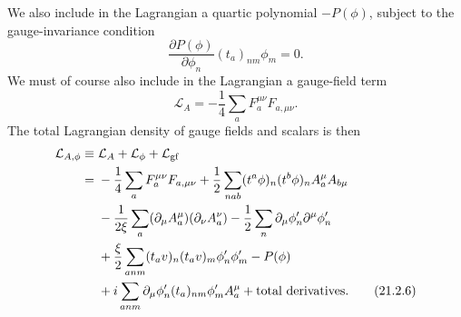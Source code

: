 We also include in the Lagrangian a quartic polynomial $-P(\phi)$, subject
to the gauge-invariance condition
\begin{equation}
 \frac{\partial P(\phi)}{\partial\phi_n}
 (t_a)_{nm}\phi_m=0.
 \tag{21.2.4}\label{eq:21.2.4}
\end{equation}
We must of course also include in the Lagrangian a gauge-field term
\begin{equation}
 \mathcal L_A=-\frac14\sum_a
 F_a^{\mu\nu}F_{a,\mu\nu}.
 \tag{21.2.5}\label{eq:21.2.5}
\end{equation}
The total Lagrangian density of gauge fields and scalars is then
\begin{align}
 \mathcal L_{A,\phi}
 \equiv{}&\mathcal L_A+\mathcal L_\phi+\mathcal L_{\rm gf}
 \notag\\
 ={}&-\frac14\sum_a F_a^{\mu\nu}F_{a,\mu\nu}
 +\frac12\sum_{nab}
 (t^a\phi)_n(t^b\phi)_n
 A_a^\mu A_{b\mu}
 \notag\\
 &-\frac1{2\xi}\sum_a
 (\partial_\mu A_a^\mu)(\partial_\nu A_a^\nu)
 -\frac12\sum_n\partial_\mu\phi'_n\partial^\mu\phi'_n
 \notag\\
 &+\frac{\xi}{2}\sum_{a nm}
 (t_a v)_n(t_a v)_m\phi'_n\phi'_m
 -P(\phi)
 \notag\\
 &+i\sum_{a nm}
 \partial_\mu\phi'_n(t_a)_{nm}\phi'_mA_a^\mu
 +\text{total derivatives}.
 \tag{21.2.6}\label{eq:21.2.6}
\end{align}

